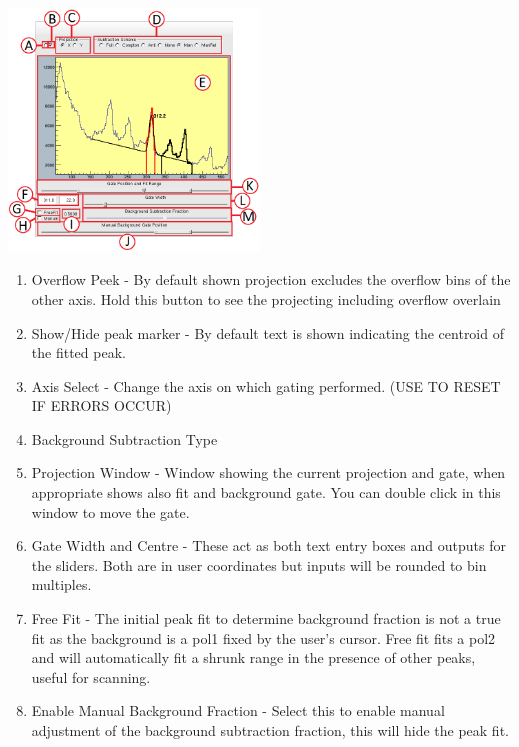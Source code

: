 \documentclass[a4paper,10pt]{article}
\begin{document}
\begin{center}
\includegraphics[width=0.5\textwidth]{jGateB.png}
\end{center}
\begin{enumerate}
\item Overflow Peek - By default shown projection excludes the overflow bins of the other axis. Hold this button to see the projecting including overflow overlain  
\item Show/Hide peak marker - By default text is shown indicating the centroid of the fitted peak.
\item Axis Select - Change the axis on which gating performed. (USE TO RESET IF ERRORS OCCUR)
\item Background Subtraction Type
\item Projection Window - Window showing the current projection and gate, when appropriate shows also fit and background gate. You can double click in this window to move the gate.
\item Gate Width and Centre - These act as both text entry boxes and outputs for the sliders. Both are in user coordinates but inputs will be rounded to bin multiples. 
\item Free Fit - The initial peak fit to determine background fraction is not a true fit as the background is a pol1 fixed by the user's cursor. Free fit fits a pol2 and will automatically fit a shrunk range in the presence of other peaks, useful for scanning.
\item Enable Manual Background Fraction - Select this to enable manual adjustment of the background subtraction fraction, this will hide the peak fit.

\end{enumerate}
\end{document}
